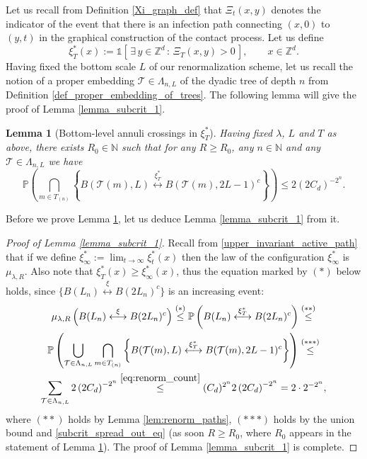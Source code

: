 \documentclass[a4paper,12pt]{article}
\newtheorem  {lemma}         [theorem]{Lemma}
\begin{document}
Let us recall from Definition \ref{Xi_graph_def} that $\Xi_t(x,y)$ denotes the indicator of the event that
there is an infection path connecting $(x,0)$ to $(y,t)$ in the graphical construction of the contact process. Let us define
\begin{equation}\label{def_xi_star_T}
  \xi^*_T(x):= \mathds{1}\left[ \, \exists \, y \in \mathbb{Z}^d \, : \, \Xi_T(x,y) >0    \, \right], \qquad x \in \mathbb{Z}^d.
\end{equation}
Having fixed the bottom scale $L$ of our renormalization scheme, let us  recall the notion of a proper embedding $\mathcal{T} \in \Lambda_{n,L}$ of the dyadic tree of depth $n$ from Definition
\ref{def_proper_embedding_of_trees}. The following lemma will give the proof of Lemma \ref{lemma_subcrit_1}.

\begin{lemma}[Bottom-level annuli crossings in $\xi^*_T$] \label{lemma_subcrit_spread_out} Having fixed $\lambda$, $L$ and $T$ as above, there exists $R_0 \in \mathbb{N}$ such that for
any $R \geq R_0$, any $n \in \mathbb{N}$ and any $\mathcal{T} \in \Lambda_{n,L}$ we have
 \begin{equation}\label{subcrit_spread_out_eq}
   \mathbb{P}\left( \bigcap_{m  \in T_{(n)}} \left\{  B(\mathcal{T}(m),  L ) \stackrel{ \xi^*_T }{\longleftrightarrow}  B(\mathcal{T}(m), 2L-1)^c \right\}    \right)
   \leq 2 \left( 2 C_d  \right)^{-2^n}.
 \end{equation}
\end{lemma}
Before we prove Lemma \ref{lemma_subcrit_spread_out}, let us deduce Lemma \ref{lemma_subcrit_1} from it.

\begin{proof}[Proof of Lemma \ref{lemma_subcrit_1}]
Recall from \eqref{upper_invariant_active_path} that if we define $\xi^*_\infty:= \lim_{t \to \infty } \xi^*_t(x) $ then the law of the configuration $\xi^*_\infty$ is
$\mu_{\lambda,R}$. Also note that $\xi^*_T(x) \geq \xi^*_\infty(x)$, thus the equation marked by $(*)$ below holds, since
$\{ B(L_{n}) \stackrel{ \xi }{\longleftrightarrow}  B(2L_n)^c \}$ is an increasing event:
\begin{multline}\label{we_use_monotone}
\mu_{\lambda,R}\left( B(L_{n}) \stackrel{ \xi }{\longleftrightarrow}  B(2L_n)^c  \right) \stackrel{(*)}{\leq} \mathbb{P} \left( B(L_{n}) \stackrel{ \xi^*_T }{\longleftrightarrow}  B(2L_n)^c \right) \stackrel{(**)}{\leq} \\
 \mathbb{P}\left( \bigcup_{ \mathcal{T} \in \Lambda_{n,L}  }  \bigcap_{m  \in T_{(n)}} \left\{  B(\mathcal{T}(m),  L ) \stackrel{ \xi^*_T }{\longleftrightarrow}  B(\mathcal{T}(m), 2L-1)^c \right\}   \right) \stackrel{(***)}{\leq}   \\
 \sum_{ \mathcal{T} \in \Lambda_{n,L}  } 2 \left( 2 C_d  \right)^{-2^n} \stackrel{ \eqref{eq:renorm_count} }{\leq} (C_d)^{2^n} 2 \left( 2 C_d  \right)^{-2^n}=2 \cdot 2^{-2^n},
\end{multline}
where $(**)$ holds by Lemma \ref{lem:renorm_paths}, $(***)$ holds by the union bound and \eqref{subcrit_spread_out_eq}  (as soon $R \geq R_0$, where $R_0$ appears in the statement of Lemma \ref{lemma_subcrit_spread_out}). The proof of Lemma \ref{lemma_subcrit_1} is complete.
\end{proof}
\end{document}
